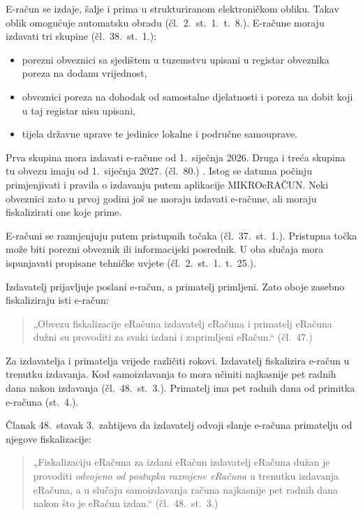E-račun se izdaje, šalje i prima u strukturiranom elektroničkom obliku.
Takav oblik omogućuje automatsku obradu (čl.~2.~st.~1.~t.~8.). E-račune
moraju izdavati tri skupine (čl.~38.~st.~1.):

\begin{itemize}[nosep, leftmargin=1.4cm]
  \item porezni obveznici sa sjedištem u tuzemstvu upisani u registar
    obveznika poreza na dodanu vrijednost,
  \item obveznici poreza na dohodak od samostalne djelatnosti i poreza na
    dobit koji u taj registar nisu upisani,
  \item tijela državne uprave te jedinice lokalne i područne samouprave.
\end{itemize}

Prva skupina mora izdavati e-račune od 1.~siječnja 2026. Druga i treća
skupina tu obvezu imaju od 1.~siječnja 2027. (čl.~80.)
\cite{nn2025zakonfiskalizacija}. Istog se datuma počinju primjenjivati i
pravila o izdavanju putem aplikacije MIKROeRAČUN. Neki obveznici zato u prvoj
godini još ne moraju izdavati e-račune, ali moraju fiskalizirati one koje
prime.

E-računi se razmjenjuju putem pristupnih točaka (čl.~37.~st.~1.). Pristupna
točka može biti porezni obveznik ili informacijski posrednik. U oba slučaja
mora ispunjavati propisane tehničke uvjete (čl.~2.~st.~1.~t.~25.).

Izdavatelj prijavljuje poslani e-račun, a primatelj primljeni. Zato oboje
zasebno fiskaliziraju isti e-račun:

\begin{quote}
„Obvezu fiskalizacije eRačuna izdavatelj eRačuna i primatelj eRačuna
dužni su provoditi za svaki izdani i zaprimljeni eRačun.“
\hfill (čl.~47.)
\end{quote}

Za izdavatelja i primatelja vrijede različiti rokovi. Izdavatelj fiskalizira
e-račun u trenutku izdavanja. Kod samoizdavanja to mora učiniti najkasnije pet
radnih dana nakon izdavanja (čl.~48.~st.~3.). Primatelj ima pet radnih dana
od primitka e-računa (st.~4.).

Članak 48.\ stavak 3.\ zahtijeva da izdavatelj odvoji slanje e-računa
primatelju od njegove fiskalizacije:

\begin{quote}
„Fiskalizaciju eRačuna za izdani eRačun izdavatelj eRačuna dužan je
provoditi \emph{odvojeno od postupka razmjene eRačuna} u trenutku
izdavanja eRačuna, a u slučaju samoizdavanja računa najkasnije pet radnih
dana nakon što je eRačun izdan.“ \hfill (čl.~48.~st.~3.)
\end{quote}

